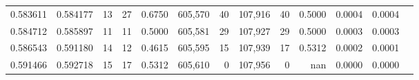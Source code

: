 \begin{tabular}{rrrrrrrrrrrrr}
0.583611 & 0.584177 &    13 &    27 &                                     0.6750 & 605,570 &      40 & 107,916 &      40 & 0.5000 & 0.0004 & 0.0004 \\
0.584712 & 0.585897 &    11 &    11 &                                     0.5000 & 605,581 &      29 & 107,927 &      29 & 0.5000 & 0.0003 & 0.0003 \\
0.586543 & 0.591180 &    14 &    12 &                                     0.4615 & 605,595 &      15 & 107,939 &      17 & 0.5312 & 0.0002 & 0.0001 \\
0.591466 & 0.592718 &    15 &    17 &                                     0.5312 & 605,610 &       0 & 107,956 &       0 &    nan & 0.0000 & 0.0000 \\
\bottomrule
\end{tabular}
